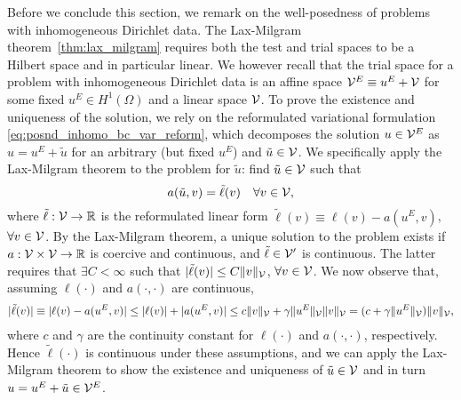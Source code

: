 Before we conclude this section, we remark on the well-posedness of problems with inhomogeneous Dirichlet data.  The Lax-Milgram theorem~\ref{thm:lax_milgram} requires both the test and trial spaces to be a Hilbert space and in particular linear. We however recall that the trial space for a problem with inhomogeneous Dirichlet data is an affine space $\mathcal{V}^E \equiv u^E + \mathcal{V}$ for some fixed $u^E \in H^1(\Omega)$ and a linear space $\mathcal{V}$. To prove the existence and uniqueness of the solution, we rely on the reformulated variational formulation \eqref{eq:posnd_inhomo_bc_var_reform}, which decomposes the solution $u \in \mathcal{V}^E$ as $u = u^E + \tilde u$ for an arbitrary (but fixed $u^E$) and $\tilde u \in \mathcal{V}$.  We specifically apply the Lax-Milgram theorem to the problem for $\tilde u$: find $\tilde u \in \mathcal{V}$ such that
  \begin{equation*}
    a(\tilde u, v) = \tilde \ell(v) \quad \forall v \in \mathcal{V},
  \end{equation*}
  where $\tilde \ell: \mathcal{V} \to \mathbb{R}$ is the reformulated linear form $\tilde \ell(v) \equiv \ell(v) - a(u^E,v)$, $\forall v \in \mathcal{V}$. By the Lax-Milgram theorem, a unique solution to the problem exists if $a:\mathcal{V} \times \mathcal{V} \to \mathbb{R}$ is coercive and continuous, and $\tilde \ell \in \mathcal{V}'$ is continuous. The latter requires that $\exists C < \infty$ such that $|\tilde \ell(v)| \leq C\| v \|_{\mathcal{V}}$, $\forall v \in \mathcal{V}$.  We now observe that, assuming $\ell(\cdot)$ and $a(\cdot,\cdot)$ are continuous, 
  \begin{align*}
    | \tilde \ell(v) | \equiv | \ell(v) - a(u^E,v) |
    \leq | \ell(v) | + | a(u^E,v) |
    \leq c \| v \|_{\mathcal{V}} + \gamma \| u^E \|_{\mathcal{V}} \| v \|_{\mathcal{V}}
    = (c + \gamma \| u^E \|_{\mathcal{V}}) \| v \|_{\mathcal{V}},
  \end{align*}
  where $c$ and $\gamma$ are the continuity constant for $\ell(\cdot)$ and $a(\cdot,\cdot)$, respectively.  Hence $\tilde \ell(\cdot)$ is continuous under these assumptions, and we can apply the Lax-Milgram theorem to show the existence and uniqueness of $\tilde u \in \mathcal{V}$ and in turn $u = u^E + \tilde u \in \mathcal{V}^E$.


